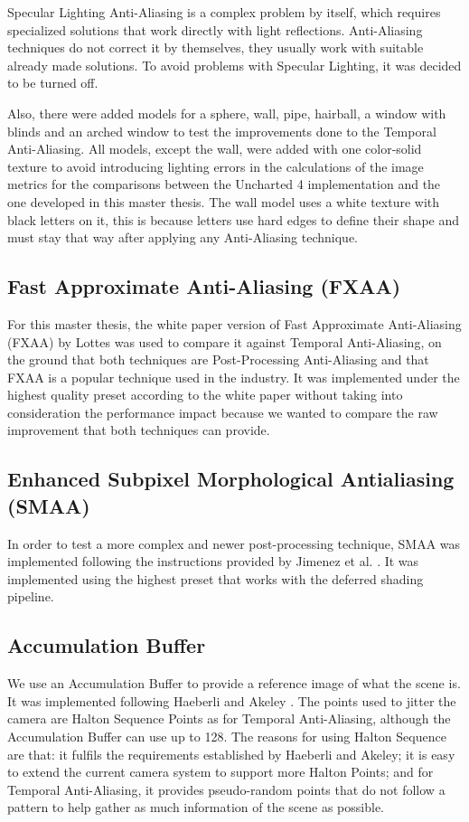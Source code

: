 \documentclass{cslthse-msc}
\begin{document}
Specular Lighting Anti-Aliasing is a complex problem by itself, which requires specialized solutions that work directly with light reflections. Anti-Aliasing techniques do not correct it by themselves, they usually work with suitable already made solutions. To avoid problems with Specular Lighting, it was decided to be turned off.

Also, there were added models for a sphere, wall, pipe, hairball, a window with blinds and an arched window to test the improvements done to the Temporal Anti-Aliasing. All models, except the wall, were added with one color-solid texture to avoid introducing lighting errors in the calculations of the image metrics for the comparisons between the Uncharted 4 implementation and the one developed in this master thesis. The wall model uses a white texture with black letters on it, this is because letters use hard edges to define their shape and must stay that way after applying any Anti-Aliasing technique.

\subsection{Fast Approximate Anti-Aliasing (FXAA)}
For this master thesis, the white paper version of Fast Approximate Anti-Aliasing (FXAA) by Lottes \cite{Lottes2009} was used to compare it against Temporal Anti-Aliasing, on the ground that both techniques are Post-Processing Anti-Aliasing and that FXAA is a popular technique used in the industry. It was implemented  under the highest quality preset according to the white paper without taking into consideration the performance impact because we wanted to compare the raw improvement that both techniques can provide.

\subsection{Enhanced Subpixel Morphological Antialiasing (SMAA)}
In order to test a more complex and newer post-processing technique, SMAA was implemented following the instructions provided by Jimenez et al. \cite{Jimenez2012}. It was implemented using the highest     preset that works with the deferred shading pipeline.

\subsection{Accumulation Buffer}
We use an Accumulation Buffer to provide a reference image of what the scene is. It was implemented following Haeberli and Akeley \cite{Haeberli1990}. The points used to jitter the camera are Halton Sequence Points as for Temporal Anti-Aliasing, although the Accumulation Buffer can use up to 128. The reasons for using Halton Sequence are that: it fulfils the requirements established by Haeberli and Akeley; it is easy to extend the current camera system to support more Halton Points; and for Temporal Anti-Aliasing, it provides pseudo-random points that do not follow a pattern to help gather as much information of the scene as possible.
\end{document}
